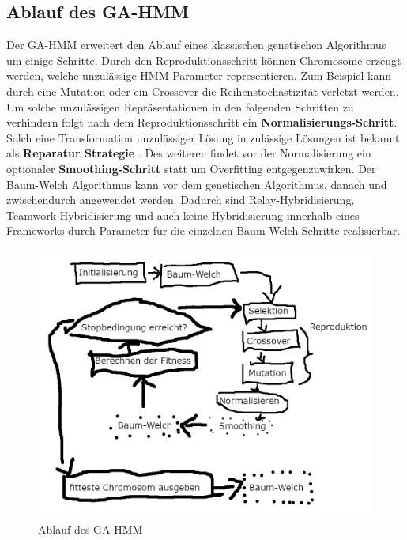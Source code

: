 \subsection*{Ablauf des GA-HMM}
Der GA-HMM erweitert den Ablauf eines klassischen genetischen Algorithmus um einige Schritte. Durch den Reproduktionsschritt können Chromosome erzeugt werden, welche unzulässige HMM-Parameter representieren. Zum Beispiel kann durch eine Mutation oder ein Crossover die Reihenstochastizität verletzt werden. Um solche unzulässigen Repräsentationen in den folgenden Schritten zu verhindern folgt nach dem Reproduktionsschritt ein \textbf{Normalisierungs-Schritt}. Solch eine Transformation unzulässiger Lösung in zulässige Lösungen ist bekannt als \textbf{Reparatur Strategie} \cite*{MetaheuristicsEGT}. Des weiteren findet vor der Normalisierung ein optionaler \textbf{Smoothing-Schritt} statt um Overfitting entgegenzuwirken. Der Baum-Welch Algorithmus kann vor dem genetischen Algorithmus, danach und zwischendurch angewendet werden. Dadurch sind Relay-Hybridisierung, Teamwork-Hybridisierung und auch keine Hybridisierung innerhalb eines Frameworks durch Parameter für die einzelnen Baum-Welch Schritte realisierbar.

\begin{figure}[h!]
    \includegraphics[scale=1.0]{images/GA-HMM_Flowchart.png}
    \caption{Ablauf des GA-HMM}
    \label{fig:gahmm_flowchart}
\end{figure}

